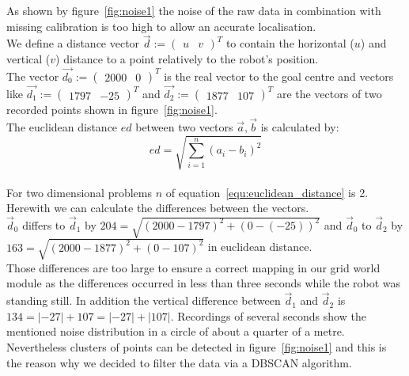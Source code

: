 \documentclass[lnicst,a4paper]{svmultln}
\begin{document}
As shown by figure~\ref{fig:noise1} the noise of the raw data in combination with missing calibration is too high to allow an accurate localisation.
\\
We define a distance vector $\vec{d} := \left( \begin{array}{cc} u & v \end{array} \right)^{T}$ to contain the horizontal ($u$) and vertical ($v$) distance to a point relatively to the robot's position. 
\\
The vector 
$\vec{d_{0}} := \left( \begin{array}{cc} 2000 & 0 \end{array} \right)^{T}$ is the real vector to the goal centre and vectors like
$\vec{d_{1}} := \left( \begin{array}{cc} 1797 & -25 \end{array} \right)^{T}$ and
$\vec{d_{2}} := \left( \begin{array}{cc} 1877 & 107 \end{array} \right)^{T}$
are the vectors of two recorded points shown in figure~\ref{fig:noise1}.
\\
The euclidean distance $ed$ between two vectors $\vec{a}, \vec{b}$ is calculated by:
\\
\begin{equation}
\label{equ:euclidean_distance}
ed = \sqrt{\sum_{i=1}^{n} (a_i - b_i)^2}
\end{equation}
\\
For two dimensional problems $n$ of equation~\ref{equ:euclidean_distance} is 2. Herewith we can calculate the differences between the vectors.
\\
$\vec{d}_{0}$ differs to $\vec{d}_{1}$ by
$ 204 = \sqrt{(2000 - 1797)^2 + (0 - (-25))^2}$ and 
$\vec{d}_{0}$ to $\vec{d}_{2}$
by $ 163 = \sqrt{(2000 - 1877)^2 + (0 - 107)^2}$
in euclidean distance.
\\
Those differences are too large to ensure a correct mapping in our grid world module as the differences occurred in less than three seconds while the robot was standing still. In addition the vertical difference between $\vec{d}_{1}$ and $\vec{d}_{2}$ is $ 134 = |-27| + 107 = |-27| + |107|$. Recordings of several seconds show the mentioned noise distribution in a circle of about a quarter of a metre.
\\
Nevertheless clusters of points can be detected in figure~\ref{fig:noise1} and this is the reason why we decided to filter the data via a DBSCAN algorithm.
\end{document}
